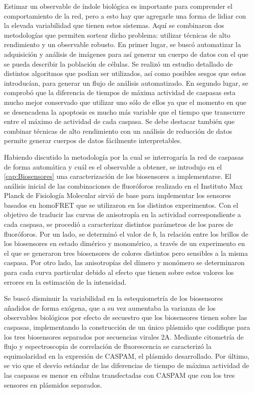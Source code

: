 Estimar un observable de índole biológica es importante para comprender el comportamiento de la red, pero a esto hay que agregarle una forma de lidiar con la elevada variabilidad que tienen estos sistemas. Aquí se combinaron dos metodologías que permiten sortear dicho problema: utilizar técnicas de alto rendimiento y un observable robusto. En primer lugar, se buscó automatizar la adquisición y análisis de imágenes para así generar un cuerpo de datos con el que se pueda describir la población de células. Se realizó un estudio detallado de distintos algoritmos que podían ser utilizados, así como posibles sesgos que estos introducían, para generar un flujo de análisis automatizado. En segundo lugar, se comprobó que la diferencia de tiempos de máxima actividad de caspasas esta mucho mejor conservado que utilizar uno sólo de ellos ya que el momento en que se desencadena la apoptosis es mucho más variable que el tiempo que transcurre entre el máximo de actividad de cada caspasa. Se debe destacar también que combinar técnicas de alto rendimiento con un análisis de reducción de datos permite generar cuerpos de datos fácilmente interpretables.

Habiendo discutido la metodología por la cual se interrogaría la red de caspasas de forma automática y cuál es el observable a obtener, se introdujo en el \cref{cap:Biosensores} una caracterización de los biosensores a implementarse. El análisis inicial de las combinaciones de fluoróforos realizado en el Instituto Max Planck de Fisiología Molecular sirvió de base para implementar los sensores basados en homoFRET que se utilizaron en los distintos experimentos. Con el objetivo de traducir las curvas de anisotropía en la actividad correspondiente a cada caspasa, se procedió a caracterizar distintos parámetros de los pares de fluoróforos. Por un lado, se determinó el valor de $b$, la relación entre los brillos de los biosensores en estado dimérico y monomérico, a través de un experimento en el que se generaron tres biosensores de colores distintos pero sensibles a la misma caspasa. Por otro lado, las anisotropías del dímero y monómero se determinaron para cada curva particular debido al efecto que tienen sobre estos valores los errores en la estimación de la intensidad.

Se buscó disminuir la variabilidad en la estequiometría de los biosensores añadidos de forma exógena, que a su vez aumentaba la varianza de los observables biológicos por efecto de secuestro que los biosensores tienen sobre las caspasas, implementando la construcción de un único plásmido que codifique para los tres biosensores separados por secuencias virales 2A. Mediante citometría de flujo y espectroscopia de correlación de fluorescencia se caracterizó la equimolaridad en la expresión de CASPAM, el plásmido desarrollado. Por último, se vio que el desvío estándar de las diferencias de tiempo de máxima actividad de las caspasas es menor en células transfectadas con CASPAM que con los tres sensores en plásmidos separados.

